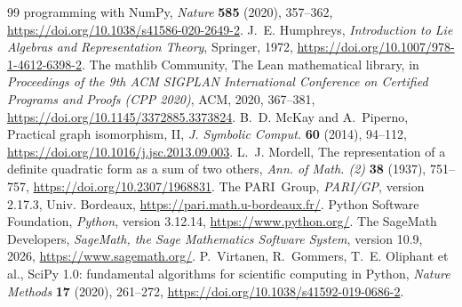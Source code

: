 \documentclass[11pt]{article}
\theoremstyle{definition}
\begin{document}
\begin{thebibliography}{99}
programming with NumPy, \textsl{Nature} \textbf{585} (2020), 357--362, \url{https://doi.org/10.1038/s41586-020-2649-2}.
 J.~E. Humphreys, \textsl{Introduction to Lie Algebras and Representation
Theory}, Springer, 1972, \url{https://doi.org/10.1007/978-1-4612-6398-2}.
 The mathlib Community, The Lean mathematical library, in \textsl{Proceedings
of the 9th ACM SIGPLAN International Conference on Certified Programs and Proofs (CPP 2020)},
ACM, 2020, 367--381, \url{https://doi.org/10.1145/3372885.3373824}.
 B.~D. McKay and A.~Piperno, Practical graph isomorphism, II,
\textsl{J. Symbolic Comput.} \textbf{60} (2014), 94--112, \url{https://doi.org/10.1016/j.jsc.2013.09.003}.
 L.~J. Mordell, The representation of a definite quadratic form as a sum
of two others, \textsl{Ann. of Math. (2)} \textbf{38} (1937), 751--757, \url{https://doi.org/10.2307/1968831}.
 The PARI~Group, \textsl{PARI/GP}, version 2.17.3, Univ. Bordeaux,
\url{https://pari.math.u-bordeaux.fr/}.
 Python Software Foundation, \textsl{Python}, version 3.12.14,
\url{https://www.python.org/}.
 The SageMath Developers, \textsl{SageMath, the Sage Mathematics Software System},
version 10.9, 2026, \url{https://www.sagemath.org/}.
 P.~Virtanen, R.~Gommers, T.~E. Oliphant et al., SciPy 1.0: fundamental
algorithms for scientific computing in Python, \textsl{Nature Methods} \textbf{17} (2020),
261--272, \url{https://doi.org/10.1038/s41592-019-0686-2}.
\end{thebibliography}
\end{document}
